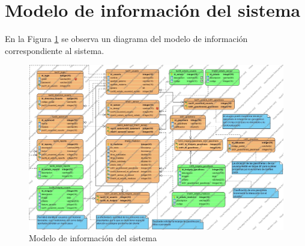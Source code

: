 \section{Modelo de información del sistema}
En la Figura \ref{fig:modelo_informacion} se observa un diagrama del modelo de información correspondiente al sistema.
\begin{figure}[H]
	\centering
	\includegraphics[scale=.34]{Capitulo4/images/modelo_informacion}
	\caption{Modelo de información del sistema}
	\label{fig:modelo_informacion}
\end{figure}